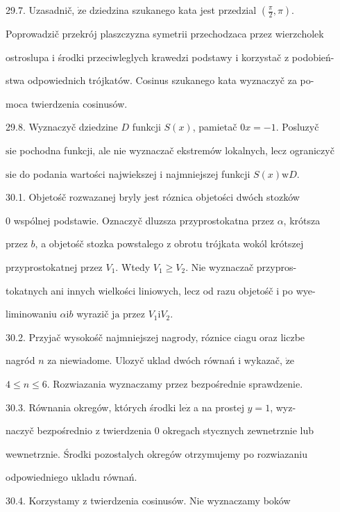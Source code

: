 \documentclass[a4paper,12pt]{article}
\begin{document}
29.7. Uzasadnič, $\dot{\mathrm{z}}\mathrm{e}$ dziedzina szukanego kata jest przedzial $(\displaystyle \frac{\pi}{2},\pi).$

Poprowadzič przekrój plaszczyzna symetrii przechodzaca przez wierzcholek

ostroslupa $\mathrm{i}$ środki przeciwleglych krawedzi podstawy $\mathrm{i}$ korzystač $\mathrm{z}$ podobień-

stwa odpowiednich trójkatów. Cosinus szukanego kata wyznaczyč za po-

moca twierdzenia cosinusów.

29.8. Wyznaczyč dziedzine $D$ funkcji $S(x)$, pamietač $0x=-1$. Posluzyč

$\mathrm{s}\mathrm{i}\mathrm{e}$ pochodna funkcji, ale nie wyznaczač ekstremów lokalnych, lecz ograniczyč

$\mathrm{s}\mathrm{i}\mathrm{e}$ do podania wartości najwiekszej $\mathrm{i}$ najmniejszej funkcji $S(x)\mathrm{w}D.$

30.1. Objetośč rozwazanej bryly jest róznica objetości dwóch stozków

$0$ wspólnej podstawie. Oznaczyč dluzsza przyprostokatna przez $\alpha$, krótsza

przez $b$, a objetośč stozka powstalego $\mathrm{z}$ obrotu trójkata wokól krótszej

przyprostokatnej przez $V_{1}$. Wtedy $V_{1} \geq V_{2}$. Nie wyznaczač przypros-

tokatnych ani innych wielkości liniowych, lecz od razu objetośč $\mathrm{i}$ po wye-

liminowaniu $\alpha \mathrm{i}b$ wyrazič $\mathrm{j}\mathrm{a}$ przez $V_{1}\mathrm{i}V_{2}.$

30.2. Przyjač wysokośč najmniejszej nagrody, róznice ciagu oraz liczbe

nagród $n$ za niewiadome. Ulozyč uklad dwóch równań $\mathrm{i}$ wykazač, $\dot{\mathrm{z}}\mathrm{e}$

$4\leq n\leq 6$. Rozwiazania wyznaczamy przez bezpośrednie sprawdzenie.

30.3. Równania okregów, których środki $\mathrm{l}\mathrm{e}\dot{\mathrm{z}}$ a na prostej $y = 1$, wyz-

naczyč bezpośrednio $\mathrm{z}$ twierdzenia $0$ okregach stycznych zewnetrznie lub

wewnetrznie. Środki pozostalych okregów otrzymujemy po rozwiazaniu

odpowiedniego ukladu równań.

30.4. Korzystamy $\mathrm{z}$ twierdzenia cosinusów. Nie wyznaczamy boków
\end{document}

